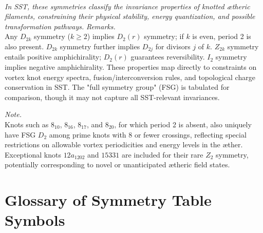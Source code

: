 \documentclass{article}
\begin{document}
\\
\textit{In SST, these symmetries classify the invariance properties of knotted ætheric filaments, constraining their physical stability, energy quantization, and possible transformation pathways.}
\noindent
\textit{Remarks.}\\
Any $D_{2k}$ symmetry ($k\geq2$) implies $D_2(r)$ symmetry; if $k$ is even, period 2 is also present. $D_{2k}$ symmetry further implies $D_{2j}$ for divisors $j$ of $k$. $Z_{2k}$ symmetry entails positive amphichirality; $D_2(r)$ guarantees reversibility. $I_2$ symmetry implies negative amphichirality. These properties map directly to constraints on vortex knot energy spectra, fusion/interconversion rules, and topological charge conservation in SST. The "full symmetry group" (FSG) is tabulated for comparison, though it may not capture all SST-relevant invariances.

\vspace{1em}

\textit{Note.}\\
Knots such as $8_{10}$, $8_{16}$, $8_{17}$, and $8_{20}$, for which period 2 is absent, also uniquely have FSG $D_2$ among prime knots with 8 or fewer crossings, reflecting special restrictions on allowable vortex periodicities and energy levels in the æther. Exceptional knots $12a_{1202}$ and $15331$ are included for their rare $Z_2$ symmetry, potentially corresponding to novel or unanticipated ætheric field states.

\section{Glossary of Symmetry Table Symbols}
\end{document}
